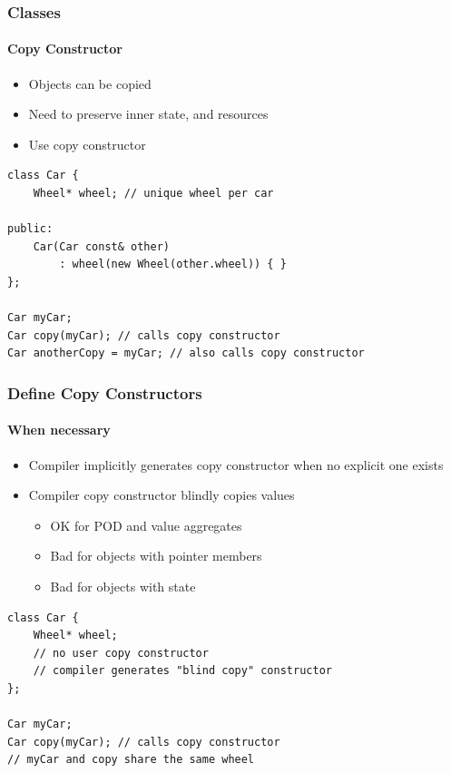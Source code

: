 \documentclass[table]{beamer}
\newcounter{rulecount}
\newcommand{\declarerule}{\textbf{\color{themeblue}{Rule \therulecount:}} }
\newcommand{\declarelesson}{\textbf{\color{themegreen}{Lesson:}} }
\begin{document}

\begin{frame}[fragile]
    \frametitle{\declarelesson Classes }
    \framesubtitle{Copy Constructor}
    \begin{itemize}
        \item Objects can be copied
        \item Need to preserve inner state, and resources
        \item Use copy constructor
    \end{itemize}
    \begin{lstlisting}[title=Copy Constructor]
class Car {
    Wheel* wheel; // unique wheel per car

public:
    Car(Car const& other)
        : wheel(new Wheel(other.wheel)) { }
};

Car myCar;
Car copy(myCar); // calls copy constructor
Car anotherCopy = myCar; // also calls copy constructor
    \end{lstlisting}
\end{frame}

\begin{frame}[fragile]
    \frametitle{\declarerule Define Copy Constructors }
    \framesubtitle{When necessary}
    \begin{itemize}
        \item Compiler implicitly generates copy constructor when no explicit one exists
        \item Compiler copy constructor blindly copies values
            \begin{itemize}
                \item OK for POD and value aggregates
                \item Bad for objects with pointer members
                \item Bad for objects with state
            \end{itemize}
    \end{itemize}
    \begin{lstlisting}[title=Copy Constructor]
class Car {
    Wheel* wheel;
    // no user copy constructor
    // compiler generates "blind copy" constructor
};

Car myCar;
Car copy(myCar); // calls copy constructor
// myCar and copy share the same wheel
    \end{lstlisting}
\end{frame}
\end{document}
